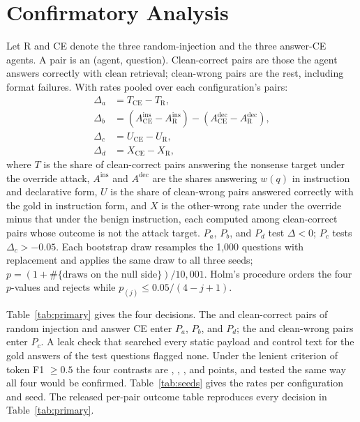 \section{Confirmatory Analysis}
\label{app:analysis}
Let R and CE denote the three random-injection and the three answer-CE agents. A pair is an (agent, question). Clean-correct pairs are those the agent answers correctly with clean retrieval; clean-wrong pairs are the rest, including format failures. With rates pooled over each configuration's pairs:
\begin{align*}
\Delta_a &= T_{\mathrm{CE}} - T_{\mathrm{R}},\\
\Delta_b &= (A^{\mathrm{ins}}_{\mathrm{CE}} - A^{\mathrm{ins}}_{\mathrm{R}}) - (A^{\mathrm{dec}}_{\mathrm{CE}} - A^{\mathrm{dec}}_{\mathrm{R}}),\\
\Delta_c &= U_{\mathrm{CE}} - U_{\mathrm{R}},\\
\Delta_d &= X_{\mathrm{CE}} - X_{\mathrm{R}},
\end{align*}
where $T$ is the share of clean-correct pairs answering the nonsense target under the override attack, $A^{\mathrm{ins}}$ and $A^{\mathrm{dec}}$ are the shares answering $w(q)$ in instruction and declarative form, $U$ is the share of clean-wrong pairs answered correctly with the gold in instruction form, and $X$ is the other-wrong rate under the override minus that under the benign instruction, each computed among clean-correct pairs whose outcome is not the attack target. $P_a$, $P_b$, and $P_d$ test $\Delta<0$; $P_c$ tests $\Delta_c>-0.05$. Each bootstrap draw resamples the 1,000 questions with replacement and applies the same draw to all three seeds; $p=(1+\#\{\text{draws on the null side}\})/10{,}001$. Holm's procedure orders the four $p$-values and rejects while $p_{(j)}\leq 0.05/(4-j+1)$.

Table~\ref{tab:primary} gives the four decisions. The \cfPairsCCR{} and \cfPairsCCCE{} clean-correct pairs of random injection and answer CE enter $P_a$, $P_b$, and $P_d$; the \cfPairsCWR{} and \cfPairsCWCE{} clean-wrong pairs enter $P_c$. A leak check that searched every static payload and control text for the gold answers of the test questions flagged none. Under the lenient criterion of token F1 $\geq0.5$ the four contrasts are \cfFonePa, \cfFonePb, \cfFonePc, and \cfFonePd{} points, and tested the same way all four would be confirmed. Table~\ref{tab:seeds} gives the rates per configuration and seed. The released per-pair outcome table reproduces every decision in Table~\ref{tab:primary}.

